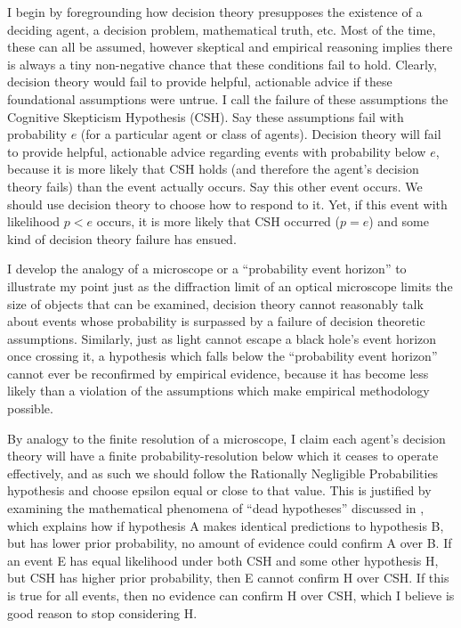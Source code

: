 \documentclass{article}
\begin{document}
I begin by foregrounding how decision theory presupposes the existence of a deciding agent, a decision problem, mathematical truth, etc. Most of the time, these can all be assumed, however skeptical and empirical reasoning implies there is always a tiny non-negative chance that these conditions fail to hold. Clearly, decision theory would fail to provide helpful, actionable advice if these foundational assumptions were untrue. I call the failure of these assumptions the Cognitive Skepticism Hypothesis (CSH). Say these assumptions fail with probability \(e\) (for a particular agent or class of agents). Decision theory will fail to provide helpful, actionable advice regarding events with probability below \(e\), because it is more likely that CSH holds (and therefore the agent's decision theory fails) than the event actually occurs. Say this other event occurs. We should use decision theory to choose how to respond to it. Yet, if this event with likelihood \(p<e\) occurs, it is more likely that CSH occurred (\(p=e\)) and some kind of decision theory failure has ensued.

I develop the analogy of a microscope or a ``probability event horizon'' to illustrate my point \textemdash{} just as the diffraction limit of an optical microscope limits the size of objects that can be examined, decision theory cannot reasonably talk about events whose probability is surpassed by a failure of decision theoretic assumptions. Similarly, just as light cannot escape a black hole's event horizon once crossing it, a hypothesis which falls below the ``probability event horizon'' cannot ever be reconfirmed by empirical evidence, because it has become less likely than a violation of the assumptions which make empirical methodology possible. 

By analogy to the finite resolution of a microscope, I claim each agent's decision theory will have a finite probability-resolution below which it ceases to operate effectively, and as such we should follow the Rationally Negligible Probabilities hypothesis and choose epsilon equal or close to that value. This is justified by examining the mathematical phenomena of ``dead hypotheses'' discussed in \citep{jaynes2003probability}, which explains how if hypothesis A makes identical predictions to hypothesis B, but has lower prior probability, no amount of evidence could confirm A over B. If an event E has equal likelihood under both CSH and some other hypothesis H, but CSH has higher prior probability, then E cannot confirm H over CSH. If this is true for all events, then no evidence can confirm H over CSH, which I believe is good reason to stop considering H.
\end{document}
